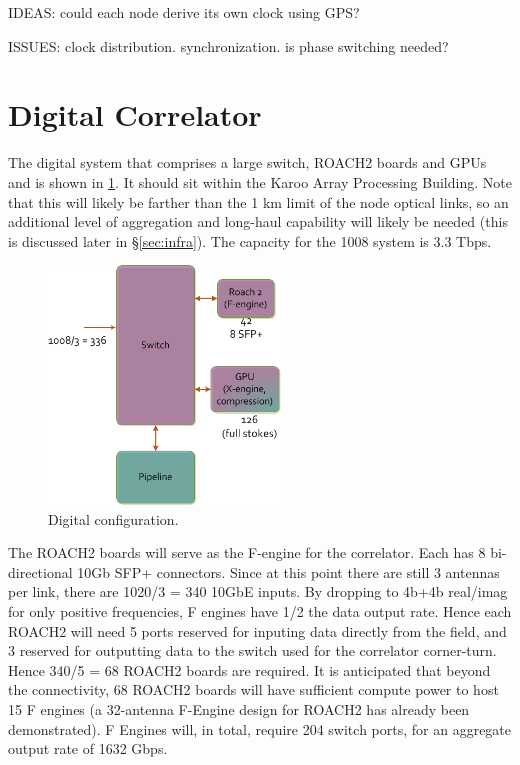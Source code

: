 \documentclass[11pt]{article}
\begin{document}
IDEAS: could each node derive its own clock using GPS?  

ISSUES: clock distribution.  synchronization.  is phase switching needed?

\section{Digital Correlator}

The digital system that comprises a large switch, ROACH2 boards and GPUs and is
shown in \ref{fig:digital}.  It should sit within the Karoo Array Processing
Building.  Note that this will likely be farther than the 1 km limit of the
node optical links, so an additional level of aggregation and long-haul
capability will likely be needed (this is discussed later in \S\ref{sec:infra}).  
The capacity for the 1008 system is 3.3 Tbps.

\begin{figure}[h]
\centering
\includegraphics[width=0.55\textwidth]{plots/Digital.png}
\caption{Digital configuration.}
\label{fig:digital}
\end{figure}

The ROACH2 boards will serve as the F-engine for the correlator.  Each
has 8 bi-directional 10Gb SFP+ connectors.  Since at this point there are still
3 antennas per link, there are 1020/3 = 340 10GbE inputs.  
By dropping to 4b+4b real/imag for only positive frequencies, F engines have 1/2
the data output rate.  Hence each ROACH2 will need 5 ports reserved for inputing data
directly from the field, and 3 reserved for outputting data to the switch used for
the correlator corner-turn.  Hence 340/5 = 68 ROACH2 boards are required.
It is anticipated
that beyond the connectivity, 68 ROACH2 boards will have sufficient compute power
to host 15 F engines (a 32-antenna F-Engine design for ROACH2 has already been demonstrated).
F Engines will, in total, require 204 switch ports, for an aggregate output rate of 1632 Gbps.
\end{document}
